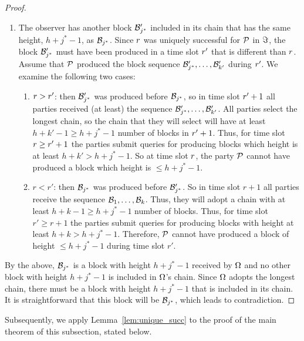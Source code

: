 \begin{proof}
\begin{enumerate}
    \item The observer has another block $\mathcal{B}'_{j^*}$ included in its chain
        that has the same height, $h+j^*-1$, as $\mathcal{B}_{j^*}$. Since $r$
            was uniquely successful for $\mathcal{P}$ in $\Im$, the
            block $\mathcal{B}'_{j^*}$ must have been produced in a time slot
            $r'$ that is different than $r$. Assume that $\mathcal{P}$
            produced the block sequence $\mathcal{B}'_{j^*},\ldots,\mathcal{B}'_{k'}$
            during $r'$. We examine the following two cases:
            \begin{enumerate}
                \item $r>r'$: then $\mathcal{B}'_{j^*}$ was produced before
                    $\mathcal{B}_{j^*}$, so in time slot $r'+1$ all parties
                    received (at least) the sequence
                    $\mathcal{B}'_{j^*},\ldots,\mathcal{B}'_{k'}$. All parties select the
                    longest chain, so the chain that they will select will have
                    at least $h+k'-1\geq h+j^*-1$ number of blocks in
                    $r'+1$. Thus, for time slot $r\geq r'+1$ the
                    parties submit queries for producing blocks which height is
                    at least $h+k'>h+j^*-1$. So at time slot $r$, the party
                    $\mathcal{P}$ cannot have produced a block which height is $\leq
                    h+j^*-1$.
                \item $r<r'$: then $\mathcal{B}_{j^*}$ was produced before
                    $\mathcal{B}'_{j^*}$. So in time slot $r+1$ all parties receive
                    the sequence $\mathcal{B}_1,\ldots,\mathcal{B}_k$. Thus, they will
                    adopt a chain with at least $h+k-1\geq h+j^*-1$ number of
                    blocks. Thus, for time slot $r'\geq r+1$ the parties submit
                    queries for producing blocks with height at least
                    $h+k>h+j^*-1$. Therefore, $\mathcal{P}$ cannot have produced a
                    block of height $\leq h+j^*-1$ during time slot $r'$.
            \end{enumerate}
    \end{enumerate}
By the above, $\mathcal{B}_{j^*}$ is a block with height $h+j^*-1$ received by
    $\Omega$ and no other block with height $h+j^*-1$ is included in
    $\Omega$'s chain. Since $\Omega$ adopts the longest chain, there must
    be a block with height $h+j^*-1$ that is included in its chain. It is
    straightforward that this block will be $\mathcal{B}_{j^*}$, which leads to
    contradiction.
\end{proof}
Subsequently, we apply Lemma~\ref{lem:unique_succ} to the proof of the main theorem of this subsection, stated below.

